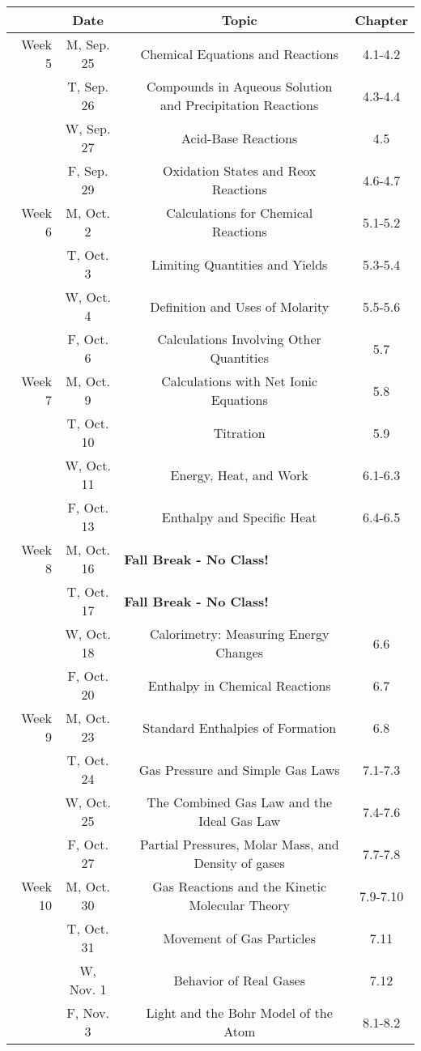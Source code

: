 \documentclass[12pt, letterpaper]{article}
\begin{document}
\noindent
\begin{tabular}{rcccc}
& Date && Topic & Chapter\\
\midrule
Week 5 & M, Sep. 25&& Chemical Equations and Reactions & 4.1-4.2\\
& T, Sep. 26&& Compounds in Aqueous Solution and Precipitation Reactions & 4.3-4.4\\
& W, Sep. 27&& Acid-Base Reactions & 4.5\\
& F, Sep. 29&& Oxidation States and Reox Reactions & 4.6-4.7\\
\midrule
Week 6 & M, Oct. 2&& Calculations for Chemical Reactions & 5.1-5.2\\
& T, Oct. 3&& Limiting Quantities and Yields & 5.3-5.4\\
& W, Oct. 4&& Definition and Uses of Molarity & 5.5-5.6\\
& F, Oct. 6&& Calculations Involving Other Quantities & 5.7\\
\midrule
Week 7 & M, Oct. 9&& Calculations with Net Ionic Equations & 5.8\\
& T, Oct. 10&& Titration & 5.9\\
& W, Oct. 11&& Energy, Heat, and Work & 6.1-6.3\\
& F, Oct. 13&& Enthalpy and Specific Heat & 6.4-6.5\\
\midrule
Week 8 & M, Oct. 16& \multicolumn{3}{l}{\textbf{Fall Break - No Class!}}\\
& T, Oct. 17& \multicolumn{3}{l}{\textbf{Fall Break - No Class!}}\\
& W, Oct. 18&& Calorimetry: Measuring Energy Changes & 6.6\\
& F, Oct. 20&& Enthalpy in Chemical Reactions & 6.7\\
\midrule
Week 9 & M, Oct. 23&& Standard Enthalpies of Formation & 6.8\\
& T, Oct. 24&& Gas Pressure and Simple Gas Laws & 7.1-7.3\\
& W, Oct. 25&& The Combined Gas Law and the Ideal Gas Law & 7.4-7.6\\
& F, Oct. 27&& Partial Pressures, Molar Mass, and Density of gases & 7.7-7.8\\
\midrule
Week 10 & M, Oct. 30&& Gas Reactions and the Kinetic Molecular Theory & 7.9-7.10\\
& T, Oct. 31&& Movement of Gas Particles & 7.11\\
& W, Nov. 1&& Behavior of Real Gases & 7.12\\
& F, Nov. 3&& Light and the Bohr Model of the Atom & 8.1-8.2\\
\end{tabular}
\end{document}

